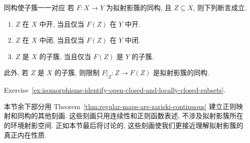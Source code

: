\begin{Corollary}{同构使子簇一一对应}\leavevmode\label{cor:quasiprojective-isomorphisms-identify-subvarieties}
若 $F:X\to Y$ 为拟射影簇的同构, 且 $Z\subseteq X$, 则下列断言成立.
\begin{enumerate}[label=\arabic*.]
  \item $Z$ 在 $X$ 中开, 当且仅当 $F(Z)$ 在 $Y$ 中开.
  \item $Z$ 在 $X$ 中闭, 当且仅当 $F(Z)$ 在 $Y$ 中闭.
  \item $Z$ 是 $X$ 的子簇, 当且仅当 $F(Z)$ 是 $Y$ 的子簇.
\end{enumerate}
此外, 若 $Z$ 是 $X$ 的子簇, 则限制 $F|_{Z}:Z\to F(Z)$ 是拟射影簇的同构.
\end{Corollary}
\begin{Proof}
Exercise~\ref{ex:isomorphisms-identify-open-closed-and-locally-closed-subsets}.
\end{Proof}

本节余下部分用 Theorem~\ref{thm:regular-maps-are-zariski-continuous} 建立正则映射和同构的其他刻画. 这些刻画只用连续性和正则函数表述, 不涉及拟射影簇所在的环境射影空间. 正如本节最后将讨论的, 这些刻画使我们更接近理解拟射影簇的真正内在性质.

